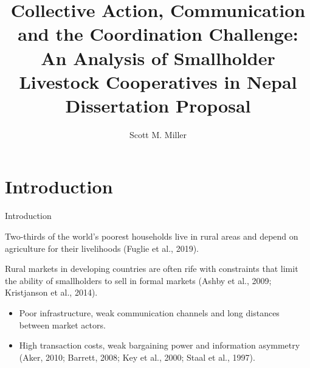 \documentclass[aspectratio=169]{beamer}
\title[Short title]{Collective Action, Communication and the Coordination Challenge:
An Analysis of Smallholder Livestock Cooperatives in Nepal \\
{\small Dissertation Proposal}} %
\author{Scott M. Miller} %
\institute[Food and Resource Economics Department, University of Florida] %
{
Food and Resource Economics Department \\ University of Florida\\ %
\medskip
}
\newenvironment{wideitemize}{\itemize\addtolength{\itemsep}{10pt}}{\enditemize}
\begin{document}
\begin{frame}
\titlepage %
\end{frame}




\section{Introduction}

\begin{frame}{Introduction}
    \begin{wideitemize}
        \item Two-thirds of the world’s poorest households live in rural areas and depend on agriculture for their livelihoods (Fuglie et al., 2019). 
        \item Rural markets in developing countries are often rife with constraints that limit the ability of smallholders to sell in formal markets (Ashby et al., 2009; Kristjanson et al., 2014). \vspace{.25cm}
            \begin{itemize}
                \item Poor infrastructure, weak communication channels and long distances between market actors. \vspace{.25cm}
                \item High transaction costs, weak bargaining power and information asymmetry (Aker, 2010; Barrett, 2008; Key et al., 2000; Staal et al., 1997).
            \end{itemize}
    \end{wideitemize}
\end{frame}
\end{document}
